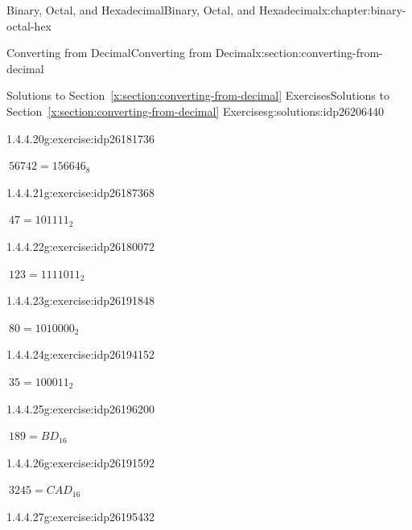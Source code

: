 \documentclass[twoside,10pt,]{book}
\newcommand{\xreffont}{\relax}
\numberwithin{equation}{section}
\begin{document}
\begin{chapterptx}{Binary, Octal, and Hexadecimal}{}{Binary, Octal, and Hexadecimal}{}{}{x:chapter:binary-octal-hex}
\begin{sectionptx}{Converting from Decimal}{}{Converting from Decimal}{}{}{x:section:converting-from-decimal}
\begin{solutions-subsection}{Solutions to Section~{\xreffont\ref*{x:section:converting-from-decimal}} Exercises}{}{Solutions to Section~{\xreffont\ref*{x:section:converting-from-decimal}} Exercises}{}{}{g:solutions:idp26206440}
\begin{exercisegroup}
\begin{divisionsolutioneg}{1.4.4.20}{}{g:exercise:idp26181736}%
\par\smallskip%
\noindent\hypertarget{g:solution:idp26185192-main}{}\(\ 56742=156646_8\)\end{divisionsolutioneg}%
\end{exercisegroup}
\par\medskip\noindent
\begin{exercisegroup}
\begin{divisionsolutioneg}{1.4.4.21}{}{g:exercise:idp26187368}%
\par\smallskip%
\noindent\hypertarget{g:solution:idp26185320-main}{}\(\ 47=101111_2\)\end{divisionsolutioneg}%
\begin{divisionsolutioneg}{1.4.4.22}{}{g:exercise:idp26180072}%
\par\smallskip%
\noindent\hypertarget{g:solution:idp26190568-main}{}\(\ 123=1111011_2\)\end{divisionsolutioneg}%
\begin{divisionsolutioneg}{1.4.4.23}{}{g:exercise:idp26191848}%
\par\smallskip%
\noindent\hypertarget{g:solution:idp26189160-main}{}\(\ 80=1010000_2\)\end{divisionsolutioneg}%
\begin{divisionsolutioneg}{1.4.4.24}{}{g:exercise:idp26194152}%
\par\smallskip%
\noindent\hypertarget{g:solution:idp26191208-main}{}\(\ 35=100011_2\)\end{divisionsolutioneg}%
\end{exercisegroup}
\par\medskip\noindent
\begin{exercisegroup}
\begin{divisionsolutioneg}{1.4.4.25}{}{g:exercise:idp26196200}%
\par\smallskip%
\noindent\hypertarget{g:solution:idp26195560-main}{}\(\ 189=BD_{16}\)\end{divisionsolutioneg}%
\begin{divisionsolutioneg}{1.4.4.26}{}{g:exercise:idp26191592}%
\par\smallskip%
\noindent\hypertarget{g:solution:idp26193128-main}{}\(\ 3245=CAD_{16}\)\end{divisionsolutioneg}%
\begin{divisionsolutioneg}{1.4.4.27}{}{g:exercise:idp26195432}%
\par\smallskip%

\end{divisionsolutioneg}
\end{exercisegroup}
\end{solutions-subsection}
\end{sectionptx}
\end{chapterptx}
\end{document}
